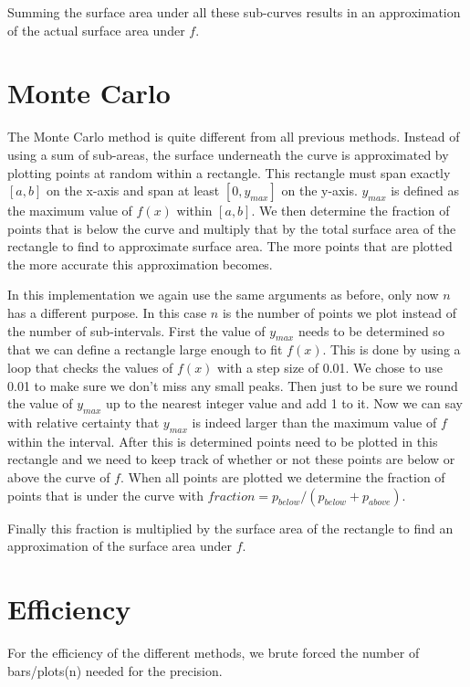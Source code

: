 \documentclass[a4paper,12px]{article}
\begin{document}
Summing the surface area under all these sub-curves results in an approximation
of the actual surface area under $f$.

\section{Monte Carlo}

The Monte Carlo method is quite different from all previous methods. Instead of
using a sum of sub-areas, the surface underneath the curve is approximated by
plotting points at random within a rectangle. This rectangle must span exactly
$[a,b]$ on the x-axis and span at least $[0,y_{max}]$ on the y-axis. $y_{max}$
is defined as the maximum value of $f(x)$ within $[a,b]$. We then determine the
fraction of points that is below the curve and multiply that by the total
surface area of the rectangle to find to approximate surface area. The more
points that are plotted the more accurate this approximation becomes.

In this implementation we again use the same arguments as before, only now $n$
has a different purpose. In this case $n$ is the number of points we plot
instead of the number of sub-intervals. First the value of $y_{max}$ needs to be
determined so that we can define a rectangle large enough to fit $f(x)$. This is
done by using a loop that checks the values of $f(x)$ with a step size of 0.01.
We chose to use 0.01 to make sure we don't miss any small peaks. Then just to be
sure we round the value of $y_{max}$ up to the nearest integer value and add 1
to it.  Now we can say with relative certainty that $y_{max}$ is indeed larger
than the maximum value of $f$ within the interval. After this is determined
points need to be plotted in this rectangle and we need to keep track of whether
or not these points are below or above the curve of $f$. When all points are
plotted we determine the fraction of points that is under the curve with
$fraction = p_{below}/(p_{below}+p_{above})$.

Finally this fraction is multiplied by the surface area of the rectangle to find
an approximation of the surface area under $f$.


\section{Efficiency}

For the efficiency of the different methods, we brute forced the number of
bars/plots(n) needed for the precision.
\end{document}
